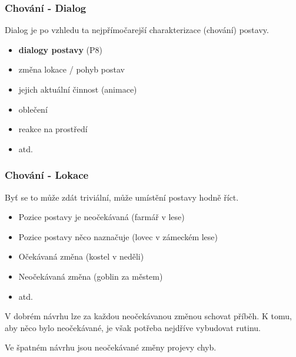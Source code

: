 ﻿\documentclass[a4paper]{beamer}
\def\uv#1{\char92\relax #1\char34\relax}
\begin{document}
\begin{frame}
\frametitle{Chování - Dialog}

Dialog je po vzhledu ta nejpřímočarejší charakterizace (chování) postavy. 

\vfill

 \begin{itemize} 
     \item \textbf{dialogy postavy} (P8)
     \item změna lokace / pohyb postav
     \item jejich aktuální činnost (animace)
     \item oblečení
     \item reakce na prostředí
     \item atd.
 \end{itemize}
\end{frame}

\begin{frame}
\frametitle{Chování - Lokace}

Byť se to může zdát triviální, může umístění postavy hodně říct.

 \begin{itemize}
     \item Pozice postavy je neočekávaná (farmář v lese) 
     \item Pozice postavy něco naznačuje (lovec v zámeckém lese) 
     \item Očekávaná změna (kostel v neděli)
     \item Neočekávaná změna (goblin za městem)     
     \item atd.
 \end{itemize}
 
 V dobrém návrhu lze za každou neočekávanou změnou \uv{schovat} příběh. 
 K tomu, aby něco bylo neočekávané, je však potřeba nejdříve vybudovat \uv{rutinu}. 
 
 \vfill
 Ve špatném návrhu jsou neočekávané změny projevy chyb. 



\end{frame}
\end{document}
